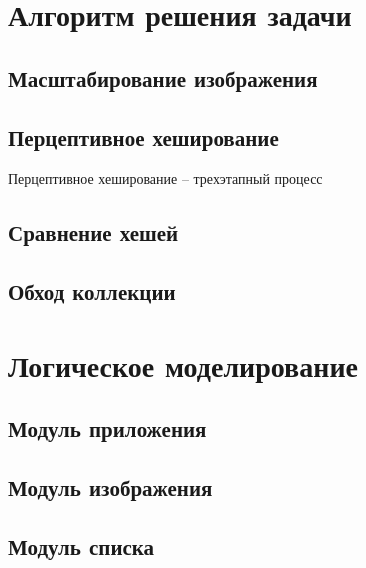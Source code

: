 \documentclass[variant=courcework]{bsuir}
\begin{document}
\section{Алгоритм решения задачи}

\subsection{Масштабирование изображения}

\subsection{Перцептивное хеширование}
Перцептивное хеширование -- трехэтапный процесс

\subsection{Сравнение хешей}

\subsection{Обход коллекции}

\section{Логическое моделирование}

\subsection{Модуль приложения}

\subsection{Модуль изображения}

\subsection{Модуль списка}
\end{document}
